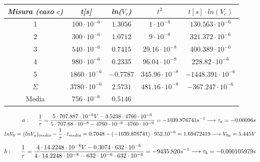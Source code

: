 \begin{center}
\begin{tabular}{|c|c|c|c|c|}
    \end{tabular}
    \begin{tabular}{|c|c|c|c|c|}
        \hline
        \textit{Misura (caso $c$)} & \textit{t[s]} & \textit{ln($V_c$)} & \textit{$t^2$} & \textit{$t[s] \cdot ln(V_c)$} \\
        \hline
        1 & $100 \cdot 10^{-6}$ & $1.3056$ & $1 \cdot 10^{-8}$ & $130.563 \cdot 10^{-6}$ \\
        \hline
        2 & $300 \cdot 10^{-6}$ & $1.0712$ & $9 \cdot 10^{-8}$ & $321.372 \cdot 10^{-6}$ \\
        \hline
        3 & $540 \cdot 10^{-6}$ & $0.7415$ & $29.16 \cdot 10^{-8}$ & $400.389 \cdot 10^{-6}$ \\
        \hline
        4 & $980 \cdot 10^{-6}$ & $0.2335$ & $96.04 \cdot 10^{-8}$ & $228.82 \cdot 10^{-6}$ \\
        \hline
        5 & $1860 \cdot 10^{-6}$ & $-0.7787$ & $345.96 \cdot 10^{-8}$ & $-1448.391 \cdot 10^{-6}$ \\
        \hline
        $\varSigma$ & $3780 \cdot 10^{-6}$ & $2.5731$ & $481.16 \cdot 10^{-8}$ & $-367.247 \cdot 10^{-6}$ \\
        \hline
        Media & $756 \cdot 10^{-6}$ & $0.5146$ & \multicolumn{2}{c}{} \\
        \hline
    \end{tabular}
    \begin{equation}
        \begin{split}
            a: \hspace{0.5 cm}\frac{1}{\tau} = \frac{5 \cdot 707.887\cdot10^{-6}V - 3.5238\cdot4760\cdot10^{-6}}{5\cdot707.68\cdot10^{-8} - 4760\cdot10^{-6}\cdot4760\cdot10^{-6}}
            = -1039.876741s^{-1} \longrightarrow \tau_a = -0.00096s
            \\
            ln{V_0} = (ln{V_a})_{medio} - \frac{1}{\tau}\cdot t_{medio} = 0.7048 - (-1039.876741)\cdot952.10^{-6} = 1.69472419 \longrightarrow V_{0a} = 5.445V
        \end{split}
    \end{equation}
    \begin{equation}
        \begin{split}
            b : \hspace{0.5 cm}\frac{1}{\tau} = \frac{4 \cdot 14.2248\cdot10^{-8}V - 0.3074\cdot632\cdot10^{-6}}{4\cdot14.2248\cdot10^{-8} - 632\cdot10^{-6}\cdot632\cdot10^{-6}}
            = -9435.820s^{-1} \longrightarrow \tau_b = -0.000105979s

\end{split}
\end{equation}
\end{center}
